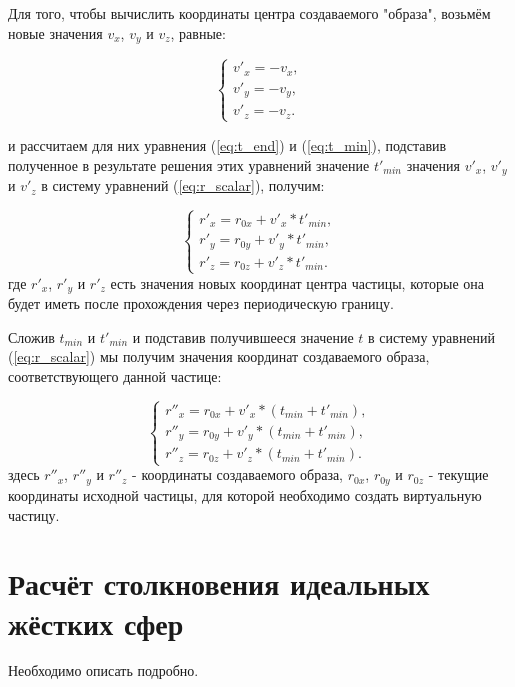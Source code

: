 \documentclass{article}
\begin{document}
Для того, чтобы вычислить координаты центра создаваемого "образа", возьмём новые значения $ v_x $, $ v_y $ и $ v_z $, равные:

\begin{equation}
    \begin{cases}
        v'_x = - v_x,
        \\
        v'_y = - v_y,
        \\
        v'_z = -v_z.
    \end{cases}
\end{equation}

и рассчитаем для них уравнения (\ref{eq:t_end}) и (\ref{eq:t_min}), подставив полученное в результате решения этих уравнений значение $ t'_{min} $  значения $ v'_x $, $ v'_y $ и $ v'_z $ в систему уравнений (\ref{eq:r_scalar}), получим:

\begin{equation}
    \begin{cases}
        r'_x = r_{0x} + v'_x * t'_{min},
        \\
        r'_y = r_{0y} + v'_y * t'_{min},
        \\
        r'_z = r_{0z} + v'_z * t'_{min}.
    \end{cases}
\end{equation}
где $ r'_x $, $ r'_y $ и $ r'_z $ есть значения новых координат центра частицы, которые она будет иметь после прохождения через периодическую границу.

Сложив $ t_{min} $ и $ t'_{min} $ и подставив получившееся значение $ t $ в систему уравнений (\ref{eq:r_scalar}) мы получим значения координат создаваемого образа, соответствующего данной частице:

\begin{equation}
    \begin{cases}
        r''_x = r_{0x} + v'_x * (t_{min} + t'_{min}),
        \\
        r''_y = r_{0y} + v'_y * (t_{min} + t'_{min}),
        \\
        r''_z = r_{0z} + v'_z * (t_{min} + t'_{min}).
    \end{cases}
\end{equation}
здесь $ r''_x $, $ r''_y $ и $ r''_z $ - координаты создаваемого образа, $ r_{0x} $, $ r_{0y} $ и $ r_{0z} $ - текущие координаты исходной частицы, для которой необходимо создать виртуальную частицу.


\newpage
\section{Расчёт столкновения идеальных жёстких сфер}
Необходимо описать подробно.
\end{document}
